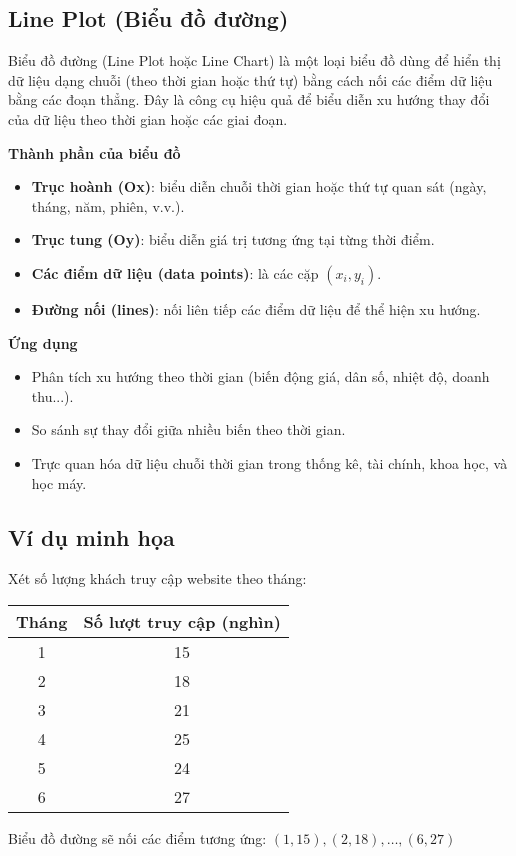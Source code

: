 \subsection{Line Plot (Biểu đồ đường)}
\label{graph:line}

Biểu đồ đường (Line Plot hoặc Line Chart) là một loại biểu đồ dùng để hiển thị dữ liệu dạng chuỗi (theo thời gian hoặc thứ tự) bằng cách nối các điểm dữ liệu bằng các đoạn thẳng. Đây là công cụ hiệu quả để biểu diễn xu hướng thay đổi của dữ liệu theo thời gian hoặc các giai đoạn.

\textbf{Thành phần của biểu đồ}

\begin{itemize}
    \item \textbf{Trục hoành (Ox)}: biểu diễn chuỗi thời gian hoặc thứ tự quan sát (ngày, tháng, năm, phiên, v.v.).
    \item \textbf{Trục tung (Oy)}: biểu diễn giá trị tương ứng tại từng thời điểm.
    \item \textbf{Các điểm dữ liệu (data points)}: là các cặp \((x_i, y_i)\).
    \item \textbf{Đường nối (lines)}: nối liên tiếp các điểm dữ liệu để thể hiện xu hướng.
\end{itemize}

\textbf{Ứng dụng}

\begin{itemize}
    \item Phân tích xu hướng theo thời gian (biến động giá, dân số, nhiệt độ, doanh thu...).
    \item So sánh sự thay đổi giữa nhiều biến theo thời gian.
    \item Trực quan hóa dữ liệu chuỗi thời gian trong thống kê, tài chính, khoa học, và học máy.
\end{itemize}

\subsection*{Ví dụ minh họa}

Xét số lượng khách truy cập website theo tháng:

\begin{center}
\begin{tabular}{|c|c|}
\hline
\textbf{Tháng} & \textbf{Số lượt truy cập (nghìn)} \\
\hline
1 & 15 \\
2 & 18 \\
3 & 21 \\
4 & 25 \\
5 & 24 \\
6 & 27 \\
\hline
\end{tabular}
\end{center}

Biểu đồ đường sẽ nối các điểm tương ứng: \((1, 15), (2, 18), \dots, (6, 27)\)
